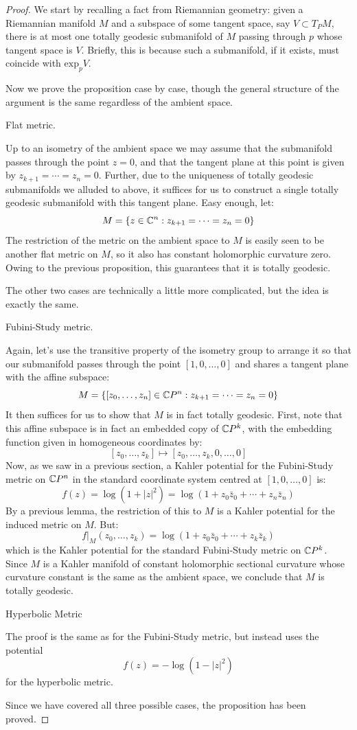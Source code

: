 \begin{proof} We start by recalling a fact from Riemannian geometry: given a Riemannian manifold $M$ and a subspace of some tangent space, say $V \subset T_P M$, there is at most one totally geodesic submanifold of $M$ passing through $p$ whose tangent space is $V$.  Briefly, this is because such a submanifold, if it exists, must coincide with $ \text{exp}_p V $.  

Now we prove the proposition case by case, though the general structure of the argument is the same regardless of the ambient space.

\begin{case} Flat metric.
\end{case}
%
Up to an isometry of the ambient space we may assume that the submanifold passes through the point $z=0$, and that the tangent plane at this point is given by $z_{k+1} = \cdots = z_n = 0$.  Further, due to the uniqueness of totally geodesic submanifolds we alluded to above, it suffices for us to construct a single totally geodesic submanifold with this tangent plane.  Easy enough, let:
%
$$M = \{ z \in \mathbb{C}^n : z_{k+1} = \cdots = z_n = 0 \}$$
%
The restriction of the metric on the ambient space to $M$ is easily seen to be another flat metric on $M$, so it also has constant holomorphic curvature zero.  Owing to the previous proposition, this guarantees that it is totally geodesic.

The other two cases are technically a little more complicated, but the idea is exactly the same.

\begin{case} Fubini-Study metric.
\end{case}
%
Again, let's use the transitive property of the isometry group to arrange it so that our submanifold passes through the point $[1,0,\ldots,0]$ and shares a tangent plane with the affine subspace:
%
$$ M = \{ [z_0, \ldots, z_n] \in \mathbb{C}P^n : z_{k+1} = \cdots = z_n = 0 \} $$
%
It then suffices for us to show that $M$ is in fact totally geodesic.  First, note that this affine subspace is in fact an embedded copy of $\mathbb{C}P^k$, with the embedding function given in homogeneous coordinates by:
%
$$ [z_0, \ldots, z_k ] \mapsto [ z_0, \ldots, z_k, 0, \ldots, 0] $$
%
Now, as we saw in a previous section, a Kahler potential for the Fubini-Study metric on $\mathbb{C}P^n$ in the standard coordinate system centred at  $[1,0,\ldots,0]$ is:
%
$$ f(z) = \log( 1 + |z|^2 ) = \log( 1 + z_0 \bar{z}_0 + \cdots + z_n \bar{z}_n ) $$
%
By a previous lemma, the restriction of this to  $M$ is a Kahler potential for the induced metric on $M$.  But:
%
$$ f|_{M} (z_0, \ldots, z_k ) = \log ( 1 + z_0 \bar{z}_0 + \cdots + z_k \bar{z}_k ) $$
%
which is the Kahler potential for the standard Fubini-Study metric on $\mathbb{C}P^k$.  Since $M$ is a Kahler manifold of constant holomorphic sectional curvature whose curvature constant is the same as the ambient space, we conclude that $M$ is totally geodesic.

\begin{case} Hyperbolic Metric
\end{case}

The proof is the same as for the Fubini-Study metric, but instead uses the potential
%
$$ f(z) = - \log( 1 - |z|^2 ) $$
%
for the hyperbolic metric.

Since we have covered all three possible cases, the proposition has been proved.
\end{proof}
